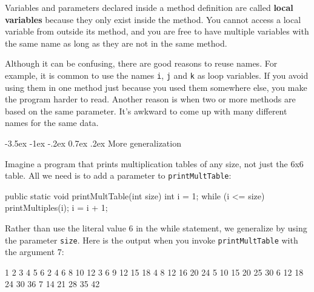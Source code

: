 \documentclass[12pt]{book}
\makeatletter
\theoremstyle{exercise}
\newcommand{\java}[1]{\verb"#1"}
\renewcommand{\section}{\@startsection {section}{1}{\z@}%
    {-3.5ex \@plus -1ex \@minus -.2ex}%
    {0.7ex \@plus.2ex}%
    {\normalfont\Large\bfseries}}
\newcommand{\java}[1]{\lstinline{#1}} %
\makeatother
\begin{document}


Variables and parameters declared inside a method definition are called {\bf local variables} because they only exist inside the method.
You cannot access a local variable from outside its method, and you are free to have multiple variables with the same name as long as they are not in the same method.


Although it can be confusing, there are good reasons to reuse names.
For example, it is common to use the names \java{i}, \java{j} and \java{k} as loop variables.
If you avoid using them in one method just because you used them somewhere else, you make the program harder to read.
Another reason is when two or more methods are based on the same parameter.
It's awkward to come up with many different names for the same data.


\section{More generalization}

Imagine a program that prints multiplication tables of any size, not just the 6x6 table.
All we need is to add a parameter to \java{printMultTable}:

\begin{code}
    public static void printMultTable(int size) {
        int i = 1;
        while (i <= size) {
            printMultiples(i);
            i = i + 1;
        }
    }
\end{code}

Rather than use the literal value 6 in the while statement, we generalize by using the parameter \java{size}.
Here is the output when you invoke \java{printMultTable} with the argument 7:

\begin{stdout}
   1   2   3   4   5   6
   2   4   6   8  10  12
   3   6   9  12  15  18
   4   8  12  16  20  24
   5  10  15  20  25  30
   6  12  18  24  30  36
   7  14  21  28  35  42
\end{stdout}
\end{document}
